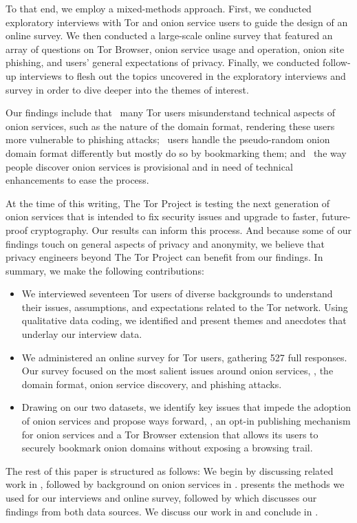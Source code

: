 To that end, we employ a mixed-methods approach. First, we conducted exploratory
interviews with Tor and onion service users to guide the design of an online
survey. We then conducted a large-scale online survey that featured an array of
questions on Tor Browser, onion service usage and operation, onion site
phishing, and users' general expectations of privacy. Finally, we conducted
follow-up interviews to flesh out the topics uncovered in the exploratory
interviews and survey in order to dive deeper into the themes of interest.

Our findings include that \first~many Tor users misunderstand technical aspects
of onion services, such as the nature of the domain format, rendering these
users more vulnerable to phishing attacks; \second~users handle the
pseudo-random onion domain format differently but mostly do so by bookmarking
them; and \third~the way people discover onion services is provisional and in
need of technical enhancements to ease the process.

At the time of this writing, The Tor Project is testing the next generation of
onion services that is intended to fix security issues and upgrade to faster, 
future-proof cryptography.  Our results can inform this process.
And because some of our findings touch on general aspects of privacy and
anonymity, we believe that privacy engineers beyond The Tor Project can benefit
from our findings.  In summary, we make the following contributions:

\begin{itemize}
    \item We interviewed seventeen Tor users of diverse backgrounds to
        understand their issues, assumptions, and expectations related to the
        Tor network.  Using qualitative data coding, we identified and present
        themes and anecdotes that underlay our interview data.

    \item We administered an online survey for Tor users, gathering 527 full
        responses.  Our survey focused on the most salient issues around onion
        services, \ie, the domain format, onion service discovery, and phishing
        attacks.

    \item Drawing on our two datasets, we identify key issues that impede the
        adoption of onion services and propose ways forward, \eg, an opt-in
        publishing mechanism for onion services and a Tor Browser extension
        that allows its users to securely bookmark onion domains without
        exposing a browsing trail.
\end{itemize}

The rest of this paper is structured as follows:  We begin by discussing related
work in , followed by background on onion services in
.   presents the methods we used for
our interviews and online survey, followed by  which discusses
our findings from both data sources.  We discuss our work in
 and conclude in .
